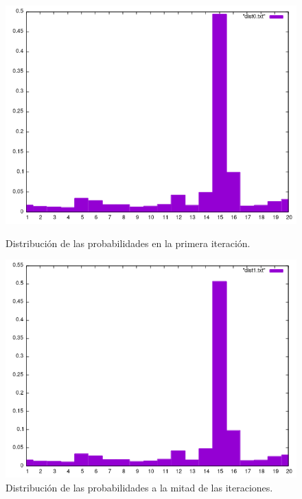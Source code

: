 \documentclass{article}
\begin{document}
    \begin{figure}[H]
      \begin{minipage}{0.5\linewidth}
        \centering
        \includegraphics[scale=0.4]{dist0}
        \caption{ Distribución de las probabilidades en la primera iteración. }
      \end{minipage}
      \begin{minipage}{0.5\linewidth}
        \centering
        \includegraphics[scale=0.4]{dist1}
        \caption{ Distribución de las probabilidades a la mitad de las iteraciones. }
      \end{minipage}
      

\end{figure}
\end{document}
